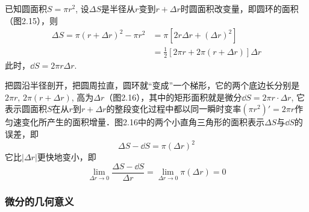\begin{solution}
    已知圆面积$S=\pi r^2$, 设$\Delta S$是半径从$r$变到$r+\Delta r$时圆面积改变量，即圆环的面积（图2.15），则
\[\begin{split}
    \Delta S=\pi(r+\Delta r)^2-\pi r^2&=\pi\left[2r\Delta r+(\Delta r)^2\right]\\
    &=\frac{1}{2}\left[2\pi r+2\pi(r+\Delta r)\right]\Delta r
\end{split}\]
此时，$\dd S=2\pi r\Delta r$.

\begin{figure}[htp]\centering
	\begin{minipage}[t]{0.48\textwidth}
		\centering
    \caption{}
\end{minipage}
\begin{minipage}[t]{0.48\textwidth}
    \centering
{}
\caption{}
\end{minipage}
\end{figure}

把圆沿半径剖开，把圆周拉直，圆环就“变成”一个梯形，它的两个底边长分别是$2\pi r$, $2\pi(r+\Delta r)$, 高为$\Delta r$（图2.16），其中的矩形面积就是微分$\dd S=2\pi r\cdot \Delta r$, 它表示圆面积$S$在从$r$到$r+\Delta r$的整段变化过程中都以同一瞬时变率$(\pi r^2)'=2\pi r$作匀速变化所产生的面积增量．图2.16中的两个小直角三角形的面积表示$\Delta S$与$\dd S$的误差，即
\[\Delta S-\dd S=\pi  (\Delta r)^2\]
它比$|\Delta r|$更快地变小，即
\[\lim_{\Delta r\to 0}\frac{\Delta S-\dd S}{\Delta r}=\lim_{\Delta r\to 0}\pi(\Delta r)=0\]
\end{solution}

\subsubsection{微分的几何意义}


